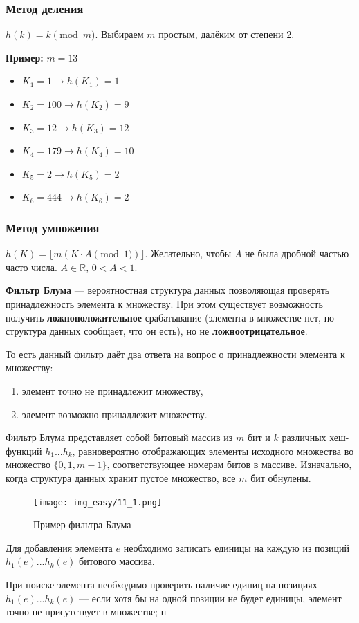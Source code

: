 \begin{enumerate}
	\subsubsection*{Метод деления}
	$h(k) = k \pmod m$. Выбираем $m$ простым, далёким от степени 2.
	
	\textbf{Пример:} $m=13$
	\begin{itemize}
		\item $K_1 = 1 \rightarrow h(K_1) = 1$
		\item $K_2 = 100 \rightarrow h(K_2) = 9$
		\item $K_3 = 12 \rightarrow h(K_3) = 12$
		\item $K_4 = 179 \rightarrow h(K_4) = 10$
		\item $K_5 = 2 \rightarrow h(K_5) = 2$
		\item $K_6 = 444 \rightarrow h(K_6) = 2$ 
	\end{itemize}
	
	\subsubsection*{Метод умножения}
	$h(K) = \lfloor m (K \cdot A \pmod 1) \rfloor$.
	Желательно, чтобы $A$ не была дробной частью часто числа. $A \in \mathbb{R}$, $0 < A < 1$.
\end{enumerate}

\begin{definition}
	\textbf{Фильтр Блума} --- вероятностная структура данных позволяющая проверять принадлежность элемента к множеству. 
	При этом существует возможность получить \textbf{ложноположительное} срабатывание (элемента в множестве нет, но структура данных сообщает, что он есть), но не \textbf{ложноотрицательное}.
\end{definition}

То есть данный фильтр даёт два ответа на вопрос о принадлежности элемента к множеству:
\begin{enumerate}
	\item элемент точно не принадлежит множеству,
	\item элемент возможно принадлежит множеству.
\end{enumerate}

Фильтр Блума представляет собой битовый массив из $m$
бит и $k$ различных хеш-функций $h_1 ... h_k$, равновероятно отображающих элементы исходного множества во множество $\{0,1, m-1\}$, соответствующее номерам битов в массиве. 
Изначально, когда структура данных хранит пустое множество, все $m$ бит обнулены.

\begin{figure}[h!]
	\centering
	\texttt{[image: img\_easy/11\_1.png]}
	\captionsetup{labelformat=empty}
	\caption{Пример фильтра Блума}
\end{figure}

Для добавления элемента $e$ необходимо записать единицы на каждую из позиций $h_1(e)...h_k(e)$ битового массива.

При поиске элемента необходимо проверить наличие единиц на позициях $h_1(e)...h_k(e)$ --- если хотя бы на одной позиции не будет единицы, элемент точно не присутствует в множестве; п
